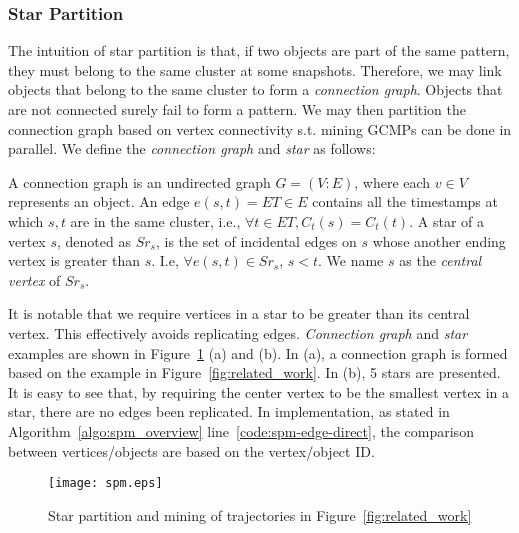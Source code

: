 \subsubsection{Star Partition}
The intuition of star partition is that, if two objects are part 
of the same pattern, they must belong to the same cluster at 
some snapshots. Therefore, we may link objects that belong to the same cluster to form a \emph{connection graph}. Objects that are
not connected surely fail to form a pattern. We may then
partition the connection graph based on vertex connectivity
s.t. mining GCMPs can be done in parallel. We define the \emph{connection graph} and \emph{star}
as follows:
\begin{definition}
A connection graph is an undirected graph $G=(V:E)$, where 
each $v \in V$ represents an object. An edge $e(s,t)= ET \in E$ 
contains all the timestamps at which $s,t$ are in the same cluster,
i.e., $\forall t \in ET, C_t(s) = C_t(t)$. 
A star of a vertex $s$, denoted as $Sr_s$, is the set of incidental edges on $s$ whose
another ending vertex is greater than $s$. I.e, $\forall e(s,t) \in Sr_s$, $s < t$. We name $s$
as the \emph{central vertex} of $Sr_s$.
\end{definition}

It is notable that we require vertices in a star to be greater than its central vertex. This 
effectively avoids replicating edges. \emph{Connection graph} and \emph{star} examples are 
shown in Figure~\ref{fig:star_partition} (a) and (b). In (a), a connection graph is formed
based on the example in Figure~\ref{fig:related_work}.
In (b), 5 stars are presented. It is easy to see that, by requiring the center vertex to be
the smallest vertex in a star, there are no edges been replicated. In implementation,
as stated in Algorithm~\ref{algo:spm_overview} line~\ref{code:spm-edge-direct}, the
comparison between vertices/objects are based on the vertex/object ID.

\begin{figure}[h]
\centering
\texttt{[image: spm.eps]}
\caption{Star partition and mining of trajectories in Figure~\ref{fig:related_work}}
\label{fig:star_partition}
\end{figure}

